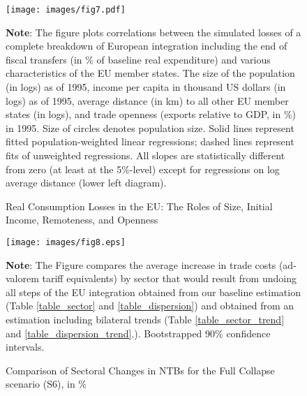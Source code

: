 \documentclass[a4paper,12pt]{article}
\begin{document}
\begin{figure}[t!]
\caption{Real Consumption Losses in the EU: The Roles of Size, Initial Income, Remoteness, and Openness}
\vspace{0.25cm}
\label{fig:collector}
\centering
\texttt{[image: images/fig7.pdf]}
\begin{fignote}{\textwidth}{\scriptsize{\textbf{Note}: The figure plots correlations between the simulated losses of a complete breakdown of European integration including the end of fiscal transfers (in \% of baseline real  expenditure) and various characteristics of the EU member states. The size of the population (in logs) as of 1995, income per capita in thousand US dollars (in logs) as of 1995, average distance (in km) to all other EU member states (in logs), and trade openness (exports relative to GDP, in \%) in 1995. Size of circles denotes population size. Solid lines represent fitted population-weighted linear regressions; dashed lines represent fits of unweighted regressions. All slopes are statistically different from zero (at least at the 5\%-level) except for regressions on log average distance (lower left diagram).}}
\end{fignote}
\end{figure}


\begin{figure}[t!]
\centering
\caption{Comparison of Sectoral Changes in NTBs for the Full Collapse scenario (S6), in \%}
\vspace{0.25cm}
\label{fig:comparison_SingleMarket}
\texttt{[image: images/fig8.eps]}
\begin{fignote}{\textwidth}{\scriptsize{\textbf{Note}: The Figure compares the average increase in trade costs (ad-valorem tariff equivalents) by sector that would result from undoing all steps of the EU integration obtained from our baseline estimation (Table \ref{table_sector} and \ref{table_dispersion}) and obtained from an estimation including bilateral trends (Table \ref{table_sector_trend} and \ref{table_dispersion_trend}.). Bootstrapped 90\% confidence intervals.}}
\end{fignote}
\end{figure}
\end{document}
